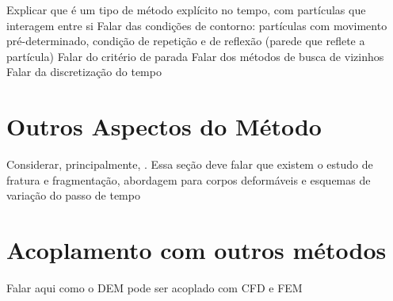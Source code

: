 \alert{Explicar que é um tipo de método explícito no tempo, com partículas que interagem entre si}
\alert{Falar das condições de contorno: partículas com movimento pré-determinado, condição de repetição e de reflexão (parede que reflete a partícula)}
\alert{Falar do critério de parada}
\alert{Falar dos métodos de busca de vizinhos}
\alert{Falar da discretização do tempo}

\section{Outros Aspectos do Método}
\alert{Considerar, principalmente, . Essa seção deve falar que existem o estudo de fratura e fragmentação, abordagem para corpos deformáveis e esquemas de variação do passo de tempo}

\section{Acoplamento com outros métodos}
\alert{Falar aqui como o DEM pode ser acoplado com CFD e FEM}